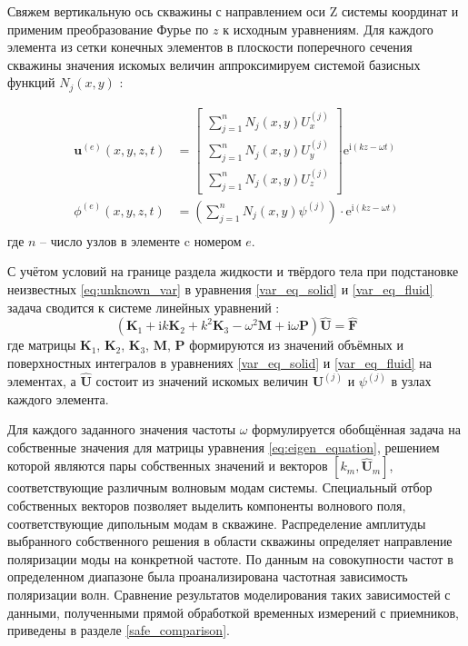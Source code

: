 \documentclass[a4paper,11pt]{article}
\newcommand{\ii}{\mathrm{i}}
\begin{document}
Свяжем вертикальную ось скважины с направлением оси Z системы координат и применим преобразование Фурье по $z$ к исходным уравнениям. Для каждого элемента из сетки конечных элементов в плоскости поперечного сечения скважины значения искомых величин аппроксимируем системой базисных функций $N_j(x,y)$ \cite{Zienkiewicz2000}:

\begin{equation}
\begin{split}
\mathbf{u}^{(e)}(x,y,z,t) &= \left[
\begin{array}{c}
\sum_{j=1}^{n}N_j(x,y)U_{x}^{(j)} \\
\sum_{j=1}^{n}N_j(x,y)U_{y}^{(j)} \\
\sum_{j=1}^{n}N_j(x,y)U_{z}^{(j)} 
\end{array}
\right] \mathrm{e}^{\ii (kz-\omega t)} %
\\
\phi^{(e)}(x,y,z,t) &= \left(\sum_{j=1}^{n}N_j(x,y)\psi^{(j)} \right) \cdot \mathrm{e}^{\ii (kz-\omega t)} %
\\
\end{split} \label{eq:unknown_var}
\end{equation}
где $n$ -- число узлов в элементе c номером $e$.  

С учётом условий на границе раздела жидкости и твёрдого тела при подстановке неизвестных \eqref{eq:unknown_var} в уравнения \eqref{var_eq_solid} и \eqref{var_eq_fluid} задача сводится к системе линейных уравнений \cite{Bartoli2006,Treyssede2013}:
\begin{equation}
(\mathbf{K}_1 + \ii k \mathbf{K}_2 + k^2 \mathbf{K}_3 - \omega^2 \mathbf{M} + \ii \omega \mathbf{P}) \hat{\mathbf{U}} = \hat{\mathbf{F}} \label{eq:eigen_equation}
\end{equation}
где матрицы $\mathbf{K}_1$, $\mathbf{K}_2$, $\mathbf{K}_3$, $\mathbf{M}$, $\mathbf{P}$ формируются из значений объёмных и поверхностных интегралов в уравнениях \eqref{var_eq_solid} и \eqref{var_eq_fluid} на элементах, а $ \hat{\mathbf{U}}$ состоит из значений искомых величин $\mathbf{U}^{(j)}$ и $\psi^{(j)}$ в узлах каждого элемента. 

Для каждого заданного значения частоты $\omega$ формулируется обобщённая задача на собственные значения для матрицы уравнения \eqref{eq:eigen_equation}, решением которой являются пары собственных значений и векторов $[k_m, \hat{\mathbf{U}}_m]$, соответствующие различным волновым модам системы. Специальный отбор собственных векторов позволяет выделить компоненты волнового поля, соответствующие дипольным модам в скважине. Распределение амплитуды выбранного собственного решения в области скважины определяет направление поляризации моды на конкретной частоте. По данным на совокупности частот в определенном диапазоне была проанализирована частотная зависимость поляризации волн. Сравнение результатов моделирования таких зависимостей с данными, полученными прямой обработкой временных измерений с приемников, приведены в разделе \ref{safe_comparison}.
\end{document}
